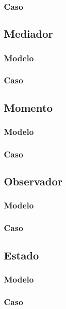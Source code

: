 \subsubsection{Caso}
\newpage

\subsection{Mediador}
\subsubsection{Modelo}
\newpage
\subsubsection{Caso}
\newpage

\subsection{Momento}
\subsubsection{Modelo}
\newpage
\subsubsection{Caso}
\newpage

\subsection{Observador}
\subsubsection{Modelo}
\newpage
\subsubsection{Caso}
\newpage

\subsection{Estado}
\subsubsection{Modelo}
\newpage
\subsubsection{Caso}
\newpage


